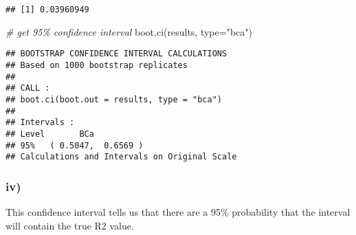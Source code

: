 \documentclass[
]{article}
\newenvironment{Shaded}{\begin{snugshade}}{\end{snugshade}}
\newcommand{\AttributeTok}[1]{\textcolor[rgb]{0.77,0.63,0.00}{#1}}
\newcommand{\CommentTok}[1]{\textcolor[rgb]{0.56,0.35,0.01}{\textit{#1}}}
\newcommand{\FunctionTok}[1]{\textcolor[rgb]{0.00,0.00,0.00}{#1}}
\newcommand{\NormalTok}[1]{#1}
\newcommand{\StringTok}[1]{\textcolor[rgb]{0.31,0.60,0.02}{#1}}
\begin{document}
\begin{verbatim}
## [1] 0.03960949
\end{verbatim}

\begin{Shaded}
\begin{Highlighting}[]
\CommentTok{\# get 95\% confidence interval}
\FunctionTok{boot.ci}\NormalTok{(results, }\AttributeTok{type=}\StringTok{"bca"}\NormalTok{)}
\end{Highlighting}
\end{Shaded}

\begin{verbatim}
## BOOTSTRAP CONFIDENCE INTERVAL CALCULATIONS
## Based on 1000 bootstrap replicates
## 
## CALL : 
## boot.ci(boot.out = results, type = "bca")
## 
## Intervals : 
## Level       BCa          
## 95%   ( 0.5047,  0.6569 )  
## Calculations and Intervals on Original Scale
\end{verbatim}

\hypertarget{iv}{%
\subsubsection{iv)}\label{iv}}

This confidence interval tells us that there are a 95\% probability that
the interval will contain the true R2 value.
\end{document}
